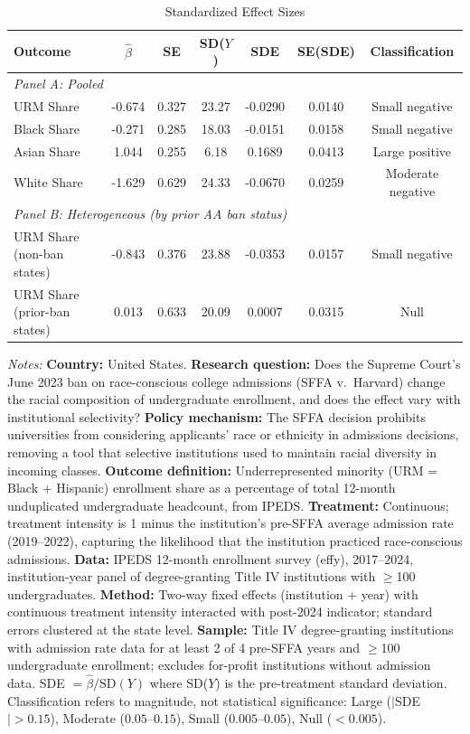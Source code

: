 \begin{table}[htbp]
\centering
\caption{Standardized Effect Sizes}
\label{tab:sde}
\begin{threeparttable}
\footnotesize
\begin{tabular}{lcccccc}
\toprule
Outcome & $\hat{\beta}$ & SE & SD($Y$) & SDE & SE(SDE) & Classification \\
\midrule
\multicolumn{7}{l}{\textit{Panel A: Pooled}} \\
\quad URM Share & -0.674 & 0.327 & 23.27 & -0.0290 & 0.0140 & Small negative \\
\quad Black Share & -0.271 & 0.285 & 18.03 & -0.0151 & 0.0158 & Small negative \\
\quad Asian Share & 1.044 & 0.255 & 6.18 & 0.1689 & 0.0413 & Large positive \\
\quad White Share & -1.629 & 0.629 & 24.33 & -0.0670 & 0.0259 & Moderate negative \\
\midrule
\multicolumn{7}{l}{\textit{Panel B: Heterogeneous (by prior AA ban status)}} \\
\quad URM Share (non-ban states) & -0.843 & 0.376 & 23.88 & -0.0353 & 0.0157 & Small negative \\
\quad URM Share (prior-ban states) & 0.013 & 0.633 & 20.09 & 0.0007 & 0.0315 & Null \\
\bottomrule
\end{tabular}
\begin{tablenotes}[flushleft]\footnotesize
\item \textit{Notes:} \textbf{Country:} United States. \textbf{Research question:} Does the Supreme Court's June 2023 ban on race-conscious college admissions (SFFA v.\ Harvard) change the racial composition of undergraduate enrollment, and does the effect vary with institutional selectivity? \textbf{Policy mechanism:} The SFFA decision prohibits universities from considering applicants' race or ethnicity in admissions decisions, removing a tool that selective institutions used to maintain racial diversity in incoming classes. \textbf{Outcome definition:} Underrepresented minority (URM = Black + Hispanic) enrollment share as a percentage of total 12-month unduplicated undergraduate headcount, from IPEDS. \textbf{Treatment:} Continuous; treatment intensity is 1 minus the institution's pre-SFFA average admission rate (2019--2022), capturing the likelihood that the institution practiced race-conscious admissions. \textbf{Data:} IPEDS 12-month enrollment survey (effy), 2017--2024, institution-year panel of degree-granting Title IV institutions with $\geq$100 undergraduates. \textbf{Method:} Two-way fixed effects (institution + year) with continuous treatment intensity interacted with post-2024 indicator; standard errors clustered at the state level. \textbf{Sample:} Title IV degree-granting institutions with admission rate data for at least 2 of 4 pre-SFFA years and $\geq$100 undergraduate enrollment; excludes for-profit institutions without admission data. SDE $= \hat{\beta} / \text{SD}(Y)$ where SD($Y$) is the pre-treatment standard deviation. Classification refers to magnitude, not statistical significance: Large ($|$SDE$| > 0.15$), Moderate ($0.05$--$0.15$), Small ($0.005$--$0.05$), Null ($< 0.005$).

\end{tablenotes}
\end{threeparttable}
\end{table}
